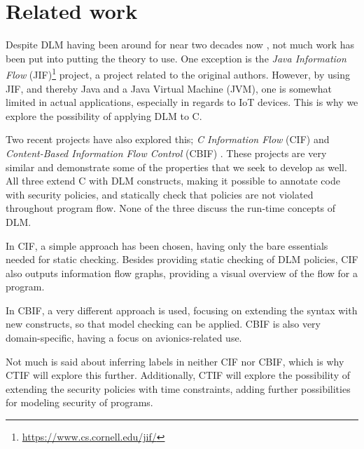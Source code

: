 
\section{Related work}
Despite DLM having been around for near two decades now \cite{myers1997}, not much work has been put into putting the theory to use.
One exception is the \emph{Java Information Flow} (JIF)\footnote{\url{https://www.cs.cornell.edu/jif/}} project, a project related to the original authors.
However, by using JIF, and thereby Java and a Java Virtual Machine (JVM), one is somewhat limited in actual applications, especially in regards to IoT devices.
This is why we explore the possibility of applying DLM to C.

Two recent projects have also explored this; \emph{C Information Flow} (CIF) \cite{muller2015cif} and \emph{Content-Based Information Flow Control} (CBIF) \cite{maciazek2016cbif}.
These projects are very similar and demonstrate some of the properties that we seek to develop as well.
All three extend C with DLM constructs, making it possible to annotate code with security policies, and statically check that policies are not violated throughout program flow.
None of the three discuss the run-time concepts of DLM.

In CIF, a simple approach has been chosen, having only the bare essentials needed for static checking.
Besides providing static checking of DLM policies, CIF also outputs information flow graphs, providing a visual overview of the flow for a program.

In CBIF, a very different approach is used, focusing on extending the syntax with new constructs, so that model checking can be applied.
CBIF is also very domain-specific, having a focus on avionics-related use.

Not much is said about inferring labels in neither CIF nor CBIF, which is why CTIF will explore this further.
Additionally, CTIF will explore the possibility of extending the security policies with time constraints, adding further possibilities for modeling security of programs.

